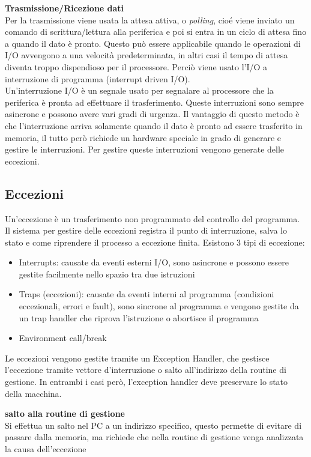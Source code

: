 \documentclass[12pt, a4paper]{article}
\begin{document}
\textbf{Trasmissione/Ricezione dati}\\Per la trasmissione viene usata la attesa attiva, o \textit{polling}, cioé 
viene inviato un comando di scrittura/lettura alla periferica e poi si entra in un ciclo di attesa fino a quando
il dato è pronto. Questo può essere applicabile quando le operazioni di I/O avvengono a una velocità predeterminata,
in altri casi il tempo di attesa diventa troppo dispendioso per il processore. Perciò viene usato l'I/O a interruzione
di programma (interrupt driven I/O).\\Un'interruzione I/O è un segnale usato per segnalare al processore che la 
periferica è pronta ad effettuare il trasferimento. Queste interruzioni sono sempre asincrone e possono avere vari 
gradi di urgenza. Il vantaggio di questo metodo è che l'interruzione arriva solamente quando il dato è pronto ad
essere trasferito in memoria, il tutto però richiede un hardware speciale in grado di generare e gestire le 
interruzioni. Per gestire queste interruzioni vengono generate delle eccezioni.

\newpage
\subsection{Eccezioni}
Un'eccezione è un trasferimento non programmato del controllo del programma. Il sistema per gestire delle eccezioni 
registra il punto di interruzione, salva lo stato e come riprendere il processo a eccezione finita. Esistono 3 tipi 
di eccezione:
\begin{itemize}
  \item Interrupts: causate da eventi esterni I/O, sono asincrone e possono essere gestite facilmente nello spazio
  tra due istruzioni
  \item Traps (eccezioni): causate da eventi interni al programma (condizioni eccezionali, errori e fault), sono 
  sincrone al programma e vengono gestite da un trap handler che riprova l'istruzione o abortisce il programma
  \item Environment call/break
\end{itemize}

Le eccezioni vengono gestite tramite un Exception Handler, che gestisce l'eccezione tramite vettore d'interruzione
o salto all'indirizzo della routine di gestione. In entrambi i casi però, l'exception handler deve preservare lo stato
della macchina.

\textbf{salto alla routine di gestione}\\Si effettua un salto nel PC a un indirizzo specifico, questo permette di
evitare di passare dalla memoria, ma richiede che nella routine di gestione venga analizzata la causa dell'eccezione
\end{document}
